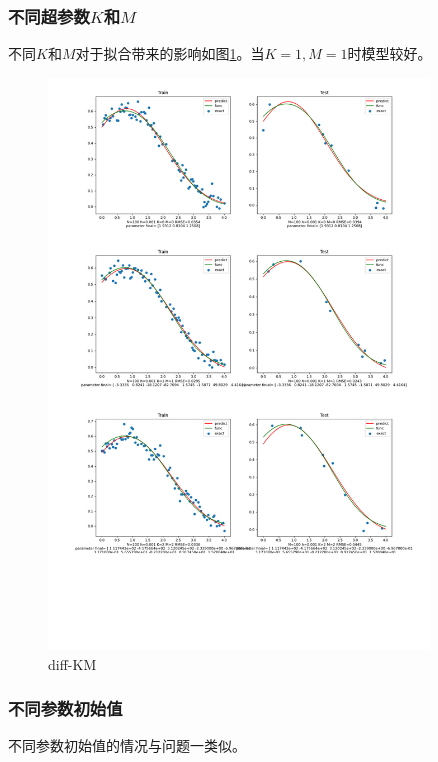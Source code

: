 \subsubsection{不同超参数$K$和$M$}

不同$K$和$M$对于拟合带来的影响如图\ref{fig:diff-KM}。当$K=1,M=1$时模型较好。

\begin{figure}[H]
    \begin{center}
        \includegraphics[width=0.9\textwidth]{img/3-diff-KM.png}
    \end{center}
   \caption[]{diff-KM}
    \label{fig:diff-KM}
\end{figure} 

\subsubsection{不同参数初始值}

不同参数初始值的情况与问题一类似。



